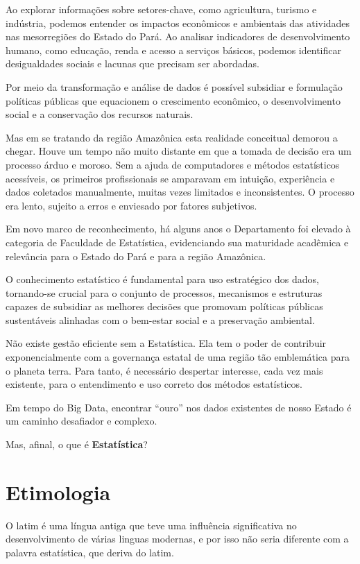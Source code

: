 \documentclass[
  letterpaper,
  DIV=11,
  numbers=noendperiod]{scrreprt}
\begin{document}
Ao explorar informações sobre setores-chave, como agricultura, turismo e
indústria, podemos entender os impactos econômicos e ambientais das
atividades nas mesorregiões do Estado do Pará. Ao analisar indicadores
de desenvolvimento humano, como educação, renda e acesso a serviços
básicos, podemos identificar desigualdades sociais e lacunas que
precisam ser abordadas.

Por meio da transformação e análise de dados é possível subsidiar e
formulação políticas públicas que equacionem o crescimento econômico, o
desenvolvimento social e a conservação dos recursos naturais.

Mas em se tratando da região Amazônica esta realidade conceitual demorou
a chegar. Houve um tempo não muito distante em que a tomada de decisão
era um processo árduo e moroso. Sem a ajuda de computadores e métodos
estatísticos acessíveis, os primeiros profissionais se amparavam em
intuição, experiência e dados coletados manualmente, muitas vezes
limitados e inconsistentes. O processo era lento, sujeito a erros e
enviesado por fatores subjetivos.

Em novo marco de reconhecimento, há alguns anos o Departamento foi
elevado à categoria de Faculdade de Estatística, evidenciando sua
maturidade acadêmica e relevância para o Estado do Pará e para a região
Amazônica.

O conhecimento estatístico é fundamental para uso estratégico dos dados,
tornando-se crucial para o conjunto de processos, mecanismos e
estruturas capazes de subsidiar as melhores decisões que promovam
políticas públicas sustentáveis alinhadas com o bem-estar social e a
preservação ambiental.

Não existe gestão eficiente sem a Estatística. Ela tem o poder de
contribuir exponencialmente com a governança estatal de uma região tão
emblemática para o planeta terra. Para tanto, é necessário despertar
interesse, cada vez mais existente, para o entendimento e uso correto
dos métodos estatísticos.

Em tempo do Big Data, encontrar ``ouro'' nos dados existentes de nosso
Estado é um caminho desafiador e complexo.

Mas, afinal, o que é \textbf{Estatística}?

\hypertarget{etimologia}{%
\section{Etimologia}\label{etimologia}}

O latim é uma língua antiga que teve uma influência significativa no
desenvolvimento de várias linguas modernas, e por isso não seria
diferente com a palavra estatística, que deriva do latim.
\end{document}
